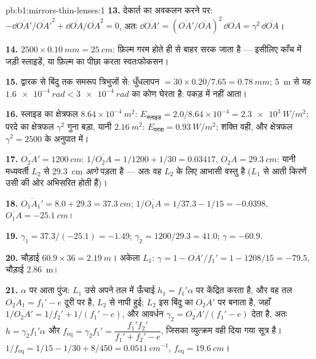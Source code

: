 \begin{solution}{pb:b1:mirrors-thin-lenses:1}
\textbf{13.} देकार्त का अवकलन करने पर: $-\dd\overline{OA'}/\overline{OA'}^2
+ \dd\overline{OA}/\overline{OA}^2 = 0$, अतः $\dd\overline{OA'} =
(\overline{OA'}/\overline{OA})^2\,\dd\overline{OA} = \gamma^2\,\dd\overline{OA}$।

\textbf{14.} $2500 \times \qty{0.10}{mm} = \qty{25}{cm}$: फ़िल्म गरम होते ही
  से बाहर सरक जाता है --- इसीलिए काँच में जड़ी स्लाइडें, या
फ़िल्म का पीछा करता स्वतःफोकसन।

\textbf{15.} द्वारक से  बिंदु तक समरूप त्रिभुजों से:
धुँधलापन $= 30 \times 0.20/7.65 = \qty{0.78}{mm}$; \qty{5}{m} से यह
$\qty{1.6e-4}{rad} < \qty{3e-4}{rad}$ का कोण घेरता है: पकड़ में नहीं आता।

\textbf{16.} स्लाइड का क्षेत्रफल $8.64\times10^{-4}\ \unit{m^2}$: $E_{\text{स्लाइड}}
= 2.0/8.64\times10^{-4} = \qty{2.3e3}{W/m^2}$; परदे का क्षेत्रफल $\gamma^2$
गुना बड़ा, यानी $\qty{2.16}{m^2}$: $E_{\text{परदा}} = \qty{0.93}{W/m^2}$;
शक्ति वही, और क्षेत्रफल $\gamma^2 = 2500$ के अनुपात में।

\textbf{17.} $\overline{O_2A'} = \qty{1200}{cm}$: $1/\overline{O_2A} =
1/1200 + 1/30 = 0.03417$, $\overline{O_2A} = \qty{+29.3}{cm}$: यानी
मध्यवर्ती  $L_2$ से \qty{29.3}{cm} \emph{आगे} पड़ता है --- अतः वह
$L_2$ के लिए आभासी वस्तु है ($L_1$ से आती किरणें उसी की ओर अभिसरित होती हैं)।

\textbf{18.} $\overline{O_1A_1'} = 8.0 + 29.3 = \qty{37.3}{cm}$;
$1/\overline{O_1A} = 1/37.3 - 1/15 = -0.0398$, $\overline{O_1A} =
\qty{-25.1}{cm}$।

\textbf{19.} $\gamma_1 = 37.3/(-25.1) = -1.49$; $\gamma_2 = 1200/29.3 =
41.0$; $\gamma = -60.9$.

\textbf{20.} चौड़ाई $60.9 \times 36 = \qty{2.19}{m}$। अकेला $L_1$:
$\gamma = 1 - \overline{OA'}/f_1' = 1 - 1208/15 = -79.5$, चौड़ाई
\qty{2.86}{m}।

\textbf{21.} $\alpha$ पर आता पुंज: $L_1$ उसे अपने  तल में ऊँचाई $h_1 = f_1'\alpha$
पर केंद्रित करता है, और वह तल $\overline{O_2A_1} = f_1' - e$ दूरी पर है, $L_2$ से नापी हुई;
$L_2$ इस बिंदु का  $\overline{O_2A'}$ पर बनाता है, जहाँ $1/\overline{O_2A'}
= 1/f_2' + 1/(f_1' - e)$, और आवर्धन $\gamma_2 = \overline{O_2A'}/(f_1'
- e)$ देता है, अतः $h = \gamma_2 f_1'\alpha$ और $f_{\mathrm{eq}} = \gamma_2 f_1'
= \dfrac{f_1' f_2'}{f_1' + f_2' - e}$, जिसका व्युत्क्रम वही दिया गया
सूत्र है। $1/f_{\mathrm{eq}} = 1/15 - 1/30 + 8/450 = \qty{0.0511}{cm^{-1}}$,
$f_{\mathrm{eq}} = \qty{19.6}{cm}$।


\end{solution}
